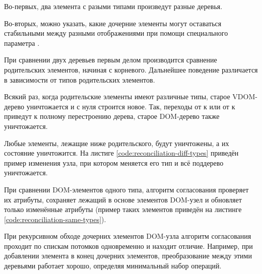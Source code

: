 Во-первых, два элемента с разыми типами произведут разные деревья.

Во-вторых, можно указать, какие дочерние элементы могут оставаться стабильными между разными отображениями при помощи специального параметра .

При сравнении двух деревьев первым делом производится сравнение родительских элементов, начиная с корневого.
Дальнейшее поведение различается в зависимости от типов родительских элементов.

Всякий раз, когда родительские элементы имеют различные типы, старое VDOM-дерево уничтожается и с нуля строится новое.
Так, переходы от  к  или от  к  приведут к полному перестроению дерева, старое DOM-дерево также уничтожается.

Любые элементы, лежащие ниже родительского, будут уничтожены, а их состояние уничтожится.
На листиге \ref{code:reconciliation-diff-types} приведён пример изменения узла, при котором меняется его тип и всё поддерево уничтожается.


При сравнении DOM-элементов одного типа, алгоритм согласования проверяет их атрибуты, сохраняет лежащий в основе элементов DOM-узел и обновляет только изменённые атрибуты (пример таких элементов приведён на листинге \ref{code:reconciliation-same-types}).


При рекурсивном обходе дочерних элементов DOM-узла алгоритм согласования проходит по спискам потомков одновременно и находит отличие.
Например, при добавлении элемента в конец дочерних элементов, преобразование между этими деревьями работает хорошо, определяя минимальный набор операций.

